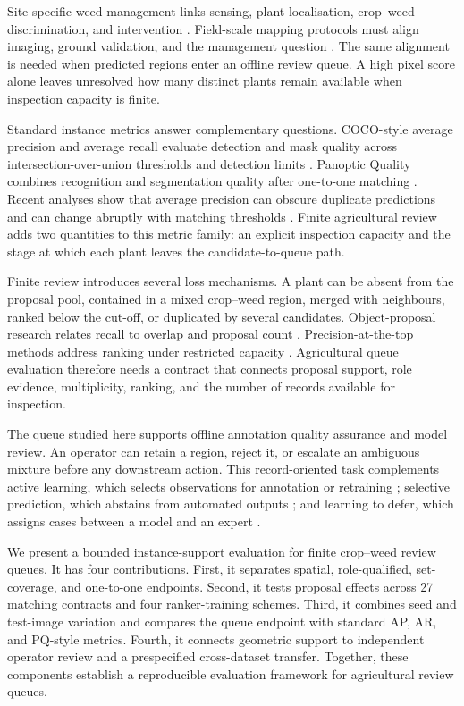 \documentclass[preprint,12pt]{elsarticle}
\begin{document}
Site-specific weed management links sensing, plant localisation, crop--weed discrimination, and intervention \cite{slaughter2008robotic,swinton2005economics}. Field-scale mapping protocols must align imaging, ground validation, and the management question \cite{casanova2025protocols}. The same alignment is needed when predicted regions enter an offline review queue. A high pixel score alone leaves unresolved how many distinct plants remain available when inspection capacity is finite.

Standard instance metrics answer complementary questions. COCO-style average precision and average recall evaluate detection and mask quality across intersection-over-union thresholds and detection limits \cite{lin2014coco}. Panoptic Quality combines recognition and segmentation quality after one-to-one matching \cite{kirillov2019panoptic}. Recent analyses show that average precision can obscure duplicate predictions and can change abruptly with matching thresholds \cite{jena2023beyondmap,chen2023sortedap}. Finite agricultural review adds two quantities to this metric family: an explicit inspection capacity and the stage at which each plant leaves the candidate-to-queue path.

Finite review introduces several loss mechanisms. A plant can be absent from the proposal pool, contained in a mixed crop--weed region, merged with neighbours, ranked below the cut-off, or duplicated by several candidates. Object-proposal research relates recall to overlap and proposal count \cite{hosang2016proposals}. Precision-at-the-top methods address ranking under restricted capacity \cite{kar2015precision}. Agricultural queue evaluation therefore needs a contract that connects proposal support, role evidence, multiplicity, ranking, and the number of records available for inspection.

The queue studied here supports offline annotation quality assurance and model review. An operator can retain a region, reject it, or escalate an ambiguous mixture before any downstream action. This record-oriented task complements active learning, which selects observations for annotation or retraining \cite{sheikh2020gradient,vanmarrewijk2024active}; selective prediction, which abstains from automated outputs \cite{geifman2017selective,geifman2019selectivenet}; and learning to defer, which assigns cases between a model and an expert \cite{mozannar2020defer,mozannar2023whoshould}.

We present a bounded instance-support evaluation for finite crop--weed review queues. It has four contributions. First, it separates spatial, role-qualified, set-coverage, and one-to-one endpoints. Second, it tests proposal effects across 27 matching contracts and four ranker-training schemes. Third, it combines seed and test-image variation and compares the queue endpoint with standard AP, AR, and PQ-style metrics. Fourth, it connects geometric support to independent operator review and a prespecified cross-dataset transfer. Together, these components establish a reproducible evaluation framework for agricultural review queues.
\end{document}
